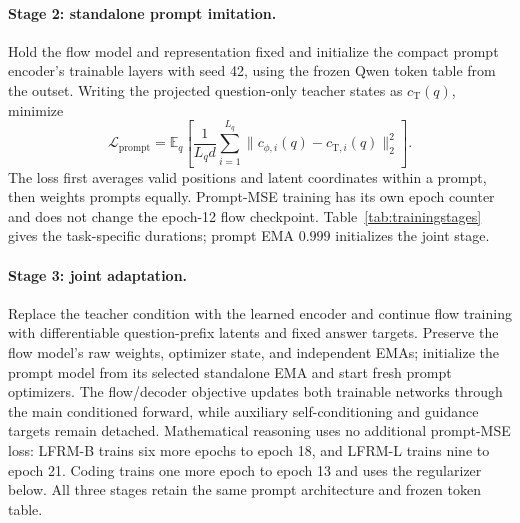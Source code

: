 \documentclass{article}
\newcommand{\E}{\mathbb{E}}
\begin{document}
\paragraph{Stage 2: standalone prompt imitation.}
Hold the flow model and representation fixed and initialize the compact prompt encoder's trainable layers with seed 42, using the frozen Qwen token table from the outset. Writing the projected question-only teacher states as $c_{\mathrm T}(q)$, minimize
\begin{equation}
 \mathcal L_{\mathrm{prompt}}=
 \E_q\!\left[\frac{1}{L_qd}\sum_{i=1}^{L_q}
 \|c_{\phi,i}(q)-c_{\mathrm T,i}(q)\|_2^2\right].
 \label{eq:methodpromptmse}
\end{equation}
The loss first averages valid positions and latent coordinates within a prompt, then weights prompts equally. Prompt-MSE training has its own epoch counter and does not change the epoch-12 flow checkpoint. Table~\ref{tab:trainingstages} gives the task-specific durations; prompt EMA $0.999$ initializes the joint stage.

\paragraph{Stage 3: joint adaptation.}
Replace the teacher condition with the learned encoder and continue flow training with differentiable question-prefix latents and fixed answer targets. Preserve the flow model's raw weights, optimizer state, and independent EMAs; initialize the prompt model from its selected standalone EMA and start fresh prompt optimizers. The flow/decoder objective updates both trainable networks through the main conditioned forward, while auxiliary self-conditioning and guidance targets remain detached. Mathematical reasoning uses no additional prompt-MSE loss: LFRM-B trains six more epochs to epoch 18, and LFRM-L trains nine to epoch 21. Coding trains one more epoch to epoch 13 and uses the regularizer below. All three stages retain the same prompt architecture and frozen token table.
\end{document}
